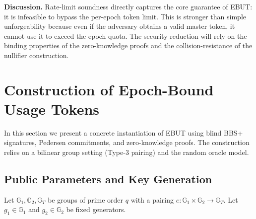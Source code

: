 \documentclass[11pt]{article}
\theoremstyle{definitionstyle}
\theoremstyle{plain}
\begin{document}
\noindent \textbf{Discussion.} Rate-limit soundness directly captures the core guarantee of EBUT: it is infeasible to bypass the per-epoch token limit. This is stronger than simple unforgeability because even if the adversary obtains a valid master token, it cannot use it to exceed the epoch quota. The security reduction will rely on the binding properties of the zero-knowledge proofs and the collision-resistance of the nullifier construction.

\section{Construction of Epoch-Bound Usage Tokens}
\label{sec:construction}

In this section we present a concrete instantiation of EBUT using blind BBS+ signatures, Pedersen commitments, and zero-knowledge proofs. The construction relies on a bilinear group setting (Type-3 pairing) and the random oracle model.

\subsection{Public Parameters and Key Generation}
\label{sec:keygen}

Let $\mathbb{G}_1, \mathbb{G}_2, \mathbb{G}_T$ be groups of prime order $q$ with a pairing $e: \mathbb{G}_1 \times \mathbb{G}_2 \to \mathbb{G}_T$. Let $g_1 \in \mathbb{G}_1$ and $g_2 \in \mathbb{G}_2$ be fixed generators.
\end{document}
